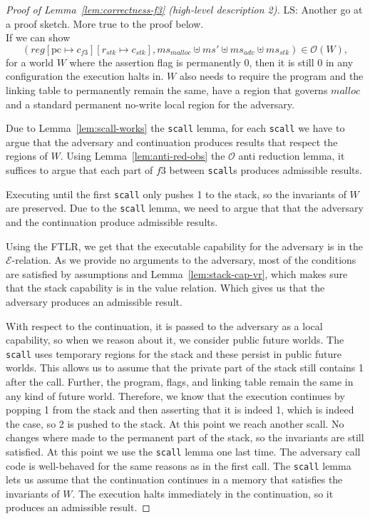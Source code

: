 \documentclass[a4paper]{article}
\newcommand{\update}[2]{[#1 \mapsto #2]}
\newcommand\lau[1]{{\color{purple} \sf \footnotesize {LS: #1}}\\}
\newcommand{\var}[1]{\mathit{#1}}
\newcommand{\hs}{\var{ms}}
\newcommand{\ms}{\hs}
\newcommand{\pcreg}{\mathrm{pc}}
\newcommand{\reg}{\var{reg}}
\newcommand{\adv}{\var{adv}}
\newcommand{\stk}{\var{stk}}
\newcommand{\codelabel}[1]{\mathit{#1}}
\newcommand{\malloc}{\codelabel{malloc}}
\newcommand{\asmType}{\plaindom{AsmType}}
\newcommand{\plaindom}[1]{\mathrm{#1}}
\newcommand{\intr}[2]{\mathcal{#1}}
\newcommand{\exprintr}[1]{\intr{E}{#1}}
\newcommand{\stder}{\exprintr{\asmType}}
\newcommand{\observations}{\mathcal{O}}
\begin{document}
\begin{proof}[Proof of Lemma~\ref{lem:correctness-f3} (high-level description 2)]
\lau{Another go at a proof sketch. More true to the proof below.}
If we can show
\begin{equation}
  (\reg\update{\pcreg}{c_{f3}}\update{r_\stk}{c_\stk},\ms_{\malloc} \uplus \ms' \uplus \ms_{\adv} \uplus \ms_\stk) \in \observations(W),
\end{equation}
for a world $W$ where the assertion flag is permanently 0, then it is still 0 in any configuration the execution halts in. $W$ also needs to require the program and the linking table to permanently remain the same, have a region that governs $\malloc$ and a standard permanent no-write local region for the adversary.

Due to Lemma~\ref{lem:scall-works} the \texttt{scall} lemma, for each \texttt{scall} we have to argue that the adversary and continuation produces results that respect the regions of $W$. Using Lemma~\ref{lem:anti-red-obs} the $\observations$ anti reduction lemma, it suffices to argue that each part of $f3$ between \texttt{scall}s produces admissible results.

Executing until the first \texttt{scall} only pushes 1 to the stack, so the invariants of $W$ are preserved. Due to the \texttt{scall} lemma, we need to argue that that the adversary and the continuation produce admissible results.

Using the FTLR, we get that the executable capability for the adversary is in the $\stder$-relation. As we provide no arguments to the adversary, most of the conditions are satisfied by assumptions and Lemma~\ref{lem:stack-cap-vr}, which makes sure that the stack capability is in the value relation. Which gives us that the adversary produces an admissible result.

With respect to the continuation, it is passed to the adversary as a local capability, so when we reason about it, we consider public future worlds. The \texttt{scall} uses temporary regions for the stack and these persist in public future worlds. This allows us to assume that the private part of the stack still contains 1 after the call. Further, the program, flags, and linking table remain the same in any kind of future world. Therefore, we know that the execution continues by popping 1 from the stack and then asserting that it is indeed 1, which is indeed the case, so 2 is pushed to the stack. At this point we reach another scall. No changes where made to the permanent part of the stack, so the invariants are still satisfied. At this point we use the \texttt{scall} lemma one last time. The adversary call code is well-behaved for the same reasons as in the first call. The \texttt{scall} lemma lets us assume that the continuation continues in a memory that satisfies the invariants of $W$. The execution halts immediately in the continuation, so it produces an admissible result.
\end{proof}
\end{document}
